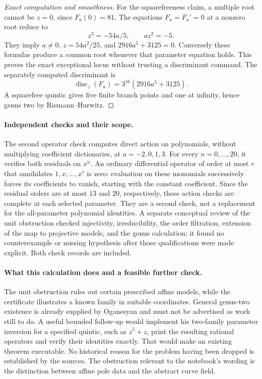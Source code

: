 \begin{proof}[Exact computation and smoothness]
For the squarefreeness claim, a multiple root cannot be \(z=0\), since \(F_a(0)=81\). The equations \(F_a=F_a'=0\) at a nonzero root reduce to
\[
 z^3=-54a/5,\qquad az^2=-5.
\]
They imply \(a\ne0\), \(z=54a^2/25\), and \(2916a^5+3125=0\). Conversely these formulas produce a common root whenever that parameter equation holds. This proves the exact exceptional locus without trusting a discriminant command. The separately computed discriminant is
\[
 \operatorname{disc}_z(F_a)=3^{16}(2916a^5+3125).
\]
A squarefree quintic gives five finite branch points and one at infinity, hence genus two by Riemann--Hurwitz.
\end{proof}

\paragraph{Independent checks and their scope.}
The second operator check computes direct action on polynomials, without multiplying coefficient dictionaries, at \(a=-2,0,1,3\). For every \(n=0,\ldots,20\), it verifies both residuals on \(x^n\). An ordinary differential operator of order at most \(r\) that annihilates \(1,x,\ldots,x^r\) is zero: evaluation on these monomials successively forces its coefficients to vanish, starting with the constant coefficient. Since the residual orders are at most \(13\) and \(20\), respectively, these action checks are complete at each selected parameter. They are a second check, not a replacement for the all-parameter polynomial identities. A separate conceptual review of the unit obstruction checked injectivity, irreducibility, the order filtration, extension of the map to projective models, and the genus calculation; it found no counterexample or missing hypothesis after those qualifications were made explicit. Both check records are included.

\paragraph{What this calculation does and a feasible further check.}
The unit obstruction rules out certain prescribed affine models, while the certificate illustrates a known family in suitable coordinates. General genus-two existence is already supplied by Oganesyan and must not be advertised as work still to do. A useful bounded follow-up would implement his two-family parameter inversion for a specified quintic, such as \(z^5+z\), print the resulting rational operators and verify their identities exactly. That would make an existing theorem executable. No historical reason for the problem having been dropped is established by the sources. The obstruction relevant to the notebook's wording is the distinction between affine pole data and the abstract curve field.

